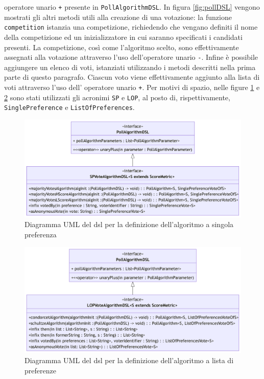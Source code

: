 \documentclass[12pt,a4paper,openright,twoside]{book}
\begin{document}
operatore unario \texttt{+} presente in \texttt{PollAlgorithmDSL}.
In figura \ref{fig:pollDSL} vengono mostrati gli altri metodi utili alla creazione di una votazione:
la funzione \texttt{competition} istanzia una competizione,
richiedendo che vengano definiti il nome della competizione ed un inizializzatore in cui saranno specificati i candidati presenti.
La competizione, così come l'algoritmo scelto, sono effettivamente assegnati alla votazione
attraverso l'uso dell'operatore unario \texttt{-}.
Infine è possibile aggiungere un elenco di voti, istanziati utilizzando i metodi descritti nella prima parte
di questo paragrafo. Ciascun voto viene effettivamente aggiunto alla lista di voti attraverso
l'uso dell' operatore unario \texttt{+}.
Per motivi di spazio, nelle figure \ref{fig:SPPollAlgorithmDSL} e \ref{fig:LOPPollAlgorithmDSL} sono stati utilizzati gli
acronimi \texttt{SP} e \texttt{LOP}, al posto di, rispettivamente, \texttt{SinglePreference} e \texttt{ListOfPreferences}.

 \vfill
 \begin{center} 
 \begin{figure}[H]
     \centering
      \includegraphics[width=1.1\linewidth]{figures/SPPollAlgorithmDSL.pdf}
      \caption{Diagramma UML del \ac{dsl} per la definizione dell'algoritmo a singola preferenza}
     \label{fig:SPPollAlgorithmDSL}
  \end{figure}
\end{center}
\vfill

\vfill
\begin{center} 
\begin{figure}[H]
    \centering
     \includegraphics[width=1.1\linewidth]{figures/LOPPollAlgorithmDSL.pdf}
     \caption{Diagramma UML del \ac{dsl} per la definizione dell'algoritmo a lista di preferenze}
    \label{fig:LOPPollAlgorithmDSL}
 \end{figure}
\end{center}
\vfill
\end{document}
